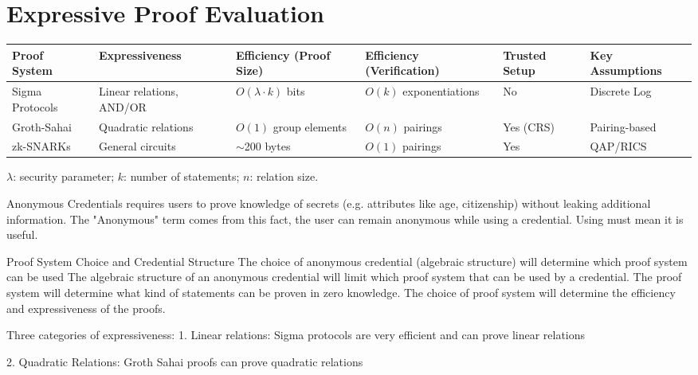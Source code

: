 
\section{Expressive Proof Evaluation}\label{chap2:expressive_proofs}

\begin{tabular}{|p{2.5cm}|p{2.5cm}|p{3cm}|p{3cm}|p{2cm}|p{3cm}|}
\hline
\textbf{Proof System} & \textbf{Expressiveness} & \textbf{Efficiency (Proof Size)} & \textbf{Efficiency (Verification)} & \textbf{Trusted Setup} & \textbf{Key Assumptions} \\
\hline
Sigma Protocols & Linear relations, AND/OR & $O(\lambda \cdot k)$ bits & $O(k)$ exponentiations & No & Discrete Log \\
\hline
Groth-Sahai & Quadratic relations & $O(1)$ group elements & $O(n)$ pairings & Yes (CRS) & Pairing-based \\
\hline
zk-SNARKs & General circuits & $\sim$200 bytes & $O(1)$ pairings & Yes & QAP/RICS \\
\hline
\end{tabular}

\vspace{0.3cm}
\begin{center}
$\lambda$: security parameter; $k$: number of statements; $n$: relation size.
\end{center}

Anonymous Credentials requires users to prove knowledge of secrets (e.g. attributes like age, citizenship) without leaking additional information. The "Anonymous" term comes from this fact, the user can remain anonymous while using a credential. Using must mean it is useful.

Proof System Choice and Credential Structure
The choice of anonymous credential (algebraic structure) will determine which proof system can be used
The algebraic structure of an anonymous credential will limit which proof system that can be used by a credential. 
The proof system will determine what kind of statements can be proven in zero knowledge.
The choice of proof system will determine the efficiency and expressiveness of the proofs.


Three categories of expressiveness:
1. Linear relations: Sigma protocols are very efficient and can prove linear relations 

2. Quadratic Relations:  Groth Sahai proofs can prove quadratic relations

